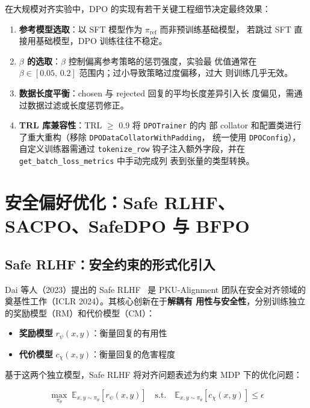 \documentclass[12pt,a4paper,UTF8]{ctexart}
\newcommand{\E}{\mathbb{E}}
\newcommand{\piref}{\pi_{\mathrm{ref}}}
\newcommand{\pitheta}{\pi_{\theta}}
\begin{document}
在大规模对齐实验中，DPO 的实现有若干关键工程细节决定最终效果：

\begin{enumerate}[leftmargin=2em]
  \item \textbf{参考模型选取}：以 SFT 模型作为 $\piref$ 而非预训练基础模型，
    若跳过 SFT 直接用基础模型，DPO 训练往往不稳定。
  \item \textbf{$\beta$ 的选取}：$\beta$ 控制偏离参考策略的惩罚强度，实验最
    优值通常在 $\beta\in[0.05,\,0.2]$ 范围内；过小导致策略过度偏移，过大
    则训练几乎无效。
  \item \textbf{数据长度平衡}：chosen 与 rejected 回复的平均长度差异引入长
    度偏见，需通过数据过滤或长度惩罚修正。
  \item \textbf{TRL 库兼容性}：TRL $\geq$ 0.9 将 \texttt{DPOTrainer} 的内
    部 collator 和配置类进行了重大重构（移除 \texttt{DPODataCollatorWithPadding}，
    统一使用 \texttt{DPOConfig}），自定义训练器需通过 \texttt{tokenize\_row}
    钩子注入额外字段，并在 \texttt{get\_batch\_loss\_metrics} 中手动完成列
    表到张量的类型转换。
\end{enumerate}

\section{安全偏好优化：Safe RLHF、SACPO、SafeDPO 与 BFPO}
\label{sec:safe}

\subsection{Safe RLHF：安全约束的形式化引入}

Dai 等人（2023）提出的 Safe RLHF~\cite{dai2023saferlhf} 是 PKU-Alignment
团队在安全对齐领域的奠基性工作（ICLR 2024）。其核心创新在于\textbf{解耦有
用性与安全性}，分别训练独立的奖励模型（RM）和代价模型（CM）：

\begin{itemize}[leftmargin=2em]
  \item \textbf{奖励模型} $r_\psi(x,y)$：衡量回复的有用性
  \item \textbf{代价模型} $c_\chi(x,y)$：衡量回复的危害程度
\end{itemize}

基于这两个独立模型，Safe RLHF 将对齐问题表述为约束 MDP 下的优化问题：

\begin{equation}
  \max_{\pitheta}\; \E_{x,y\sim\pitheta}\!\left[r_\psi(x,y)\right]
  \quad \text{s.t.} \quad
  \E_{x,y\sim\pitheta}\!\left[c_\chi(x,y)\right] \leq \epsilon
  \label{eq:safe_rlhf}
\end{equation}
\end{document}
